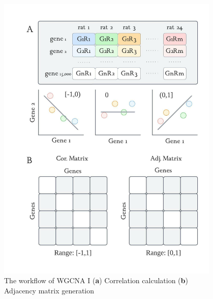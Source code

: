 \documentclass[
11pt,notheorems,hyperref={pdfauthor=whatever}
]{beamer}
\begin{document}
\begin{frame}
\begin{columns}[T,onlytextwidth]
\begin{itemize}
            \end{itemize}
        \vspace{-35px}
        \begin{figure}[h]
            \renewcommand{\figurename}{Figure 5}
            \includegraphics [scale=0.6] {AldoFruc_AdjMatrix.jpg} 
            \captionsetup{justification=centering}
            \caption{The workflow of WGCNA I (\textbf{a}) Correlation calculation (\textbf{b}) Adjacency matrix generation}
        \end{figure}
    \end{columns}
\end{frame}
\end{document}

